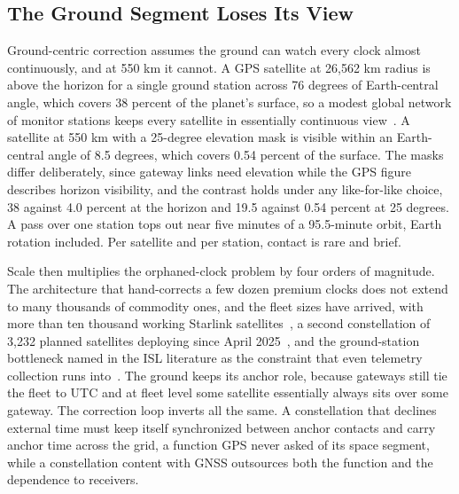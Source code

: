 \documentclass[twocolumn,10pt]{article}
\begin{document}
\subsection{The Ground Segment Loses Its View}\label{sec:break-control}
Ground-centric correction assumes the ground can watch every clock almost continuously, and at 550 km it cannot. A GPS satellite at 26{,}562 km radius is above the horizon for a single ground station across 76 degrees of Earth-central angle, which covers 38 percent of the planet's surface, so a modest global network of monitor stations keeps every satellite in essentially continuous view~\cite{gpscontrol}. A satellite at 550 km with a 25-degree elevation mask is visible within an Earth-central angle of 8.5 degrees, which covers 0.54 percent of the surface. The masks differ deliberately, since gateway links need elevation while the GPS figure describes horizon visibility, and the contrast holds under any like-for-like choice, 38 against 4.0 percent at the horizon and 19.5 against 0.54 percent at 25 degrees. A pass over one station tops out near five minutes of a 95.5-minute orbit, Earth rotation included. Per satellite and per station, contact is rare and brief.

Scale then multiplies the orphaned-clock problem by four orders of magnitude. The architecture that hand-corrects a few dozen premium clocks does not extend to many thousands of commodity ones, and the fleet sizes have arrived, with more than ten thousand working Starlink satellites~\cite{mcdowellstats}, a second constellation of 3{,}232 planned satellites deploying since April 2025~\cite{kuiper}, and the ground-station bottleneck named in the ISL literature as the constraint that even telemetry collection runs into~\cite{wu2024}. The ground keeps its anchor role, because gateways still tie the fleet to UTC and at fleet level some satellite essentially always sits over some gateway. The correction loop inverts all the same. A constellation that declines external time must keep itself synchronized between anchor contacts and carry anchor time across the grid, a function GPS never asked of its space segment, while a constellation content with GNSS outsources both the function and the dependence to receivers.
\end{document}
